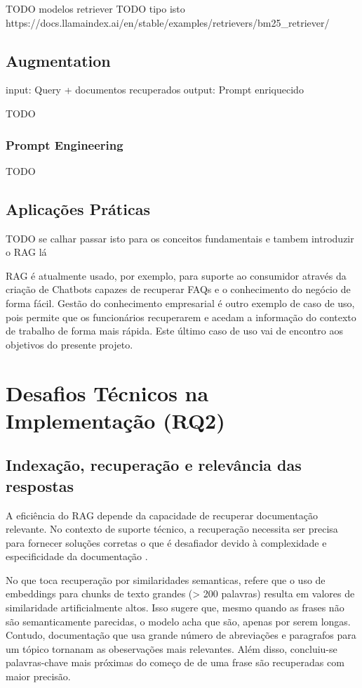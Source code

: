 TODO modelos retriever
TODO tipo isto https://docs.llamaindex.ai/en/stable/examples/retrievers/bm25_retriever/


\subsection{Augmentation}
\label{augmentation}

input: Query + documentos recuperados
output: Prompt enriquecido

TODO

\subsubsection{Prompt Engineering}

TODO

\subsection{Aplicações Práticas}

TODO se calhar passar isto para os conceitos fundamentais e tambem introduzir o RAG lá 

RAG é atualmente usado, por exemplo, para suporte ao consumidor através da criação de Chatbots capazes de recuperar FAQs e o conhecimento do negócio de forma fácil. Gestão do conhecimento empresarial é outro exemplo de caso de uso, pois permite que os funcionários recuperarem e acedam a informação do contexto de trabalho de forma mais rápida. Este último caso de uso vai de encontro aos objetivos do presente projeto. 




\section{Desafios Técnicos na Implementação (RQ2)}


\subsection{Indexação, recuperação e relevância das respostas}

A eficiência do RAG depende da capacidade de recuperar documentação relevante. No contexto de suporte técnico, a recuperação necessita ser precisa para fornecer soluções corretas o que é desafiador devido à complexidade e especificidade da documentação \parencite{ToroIsaza2024}.


No que toca recuperação por similaridades semanticas, \cite{soman2024observations} refere que o uso de embeddings para chunks de texto grandes (> 200 palavras) resulta em valores de similaridade artificialmente altos. Isso sugere que, mesmo quando as frases não são semanticamente parecidas, o modelo acha que são, apenas por serem longas. Contudo, documentação que usa grande número de abreviações e paragrafos para um tópico tornanam as obeservações mais relevantes. Além disso, concluiu-se palavras-chave mais próximas do começo de de uma frase são recuperadas com maior precisão.

